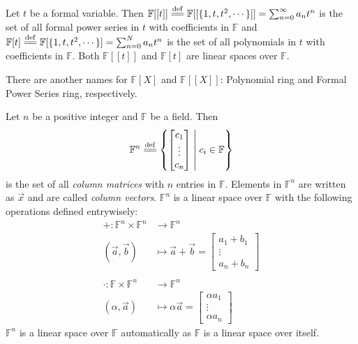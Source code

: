 \documentclass[
	11pt, %
	fleqn, %
	a4paper, %
]{LegrandOrangeBook}
\newcommand{\F}{\mathbb{F}} %
\begin{document}
\begin{example}
    Let $t$ be a formal variable. Then $\F[[t]] \overset{\mathrm{def}}{=\joinrel=} \F[[\{ 1, t, t^2, \cdots \}]] = \sum_{n = 0}^{\infty} a_n t^n$ is the set of all formal power series in $t$ with coefficients in $\F$ and $\F[t] \overset{\mathrm{def}}{=\joinrel=} \F[\{ 1, t, t^2, \cdots \}] = \sum_{n = 0}^{N} a_n t^n$ is the set of all polynomials in $t$ with coefficients in $\F$. Both $\F[[t]]$ and $\F[t]$ are linear spaces over $\F$.
\end{example}

There are another names for $\F[X]$ and $\F[[X]]$: Polynomial ring and Formal Power Series ring, respectively.

\begin{example}
    Let $n$ be a positive integer and $\F$ be a field. Then 
    \[
        \F^n \overset{\mathrm{def}}{=\joinrel=} \left\{ 
        \begin{bmatrix}
        c_1 \\
        \vdots \\
        c_n
        \end{bmatrix}
        \;\middle|\; c_i \in \F
        \right\}
    \]
    is the set of all \emph{column matrices} with $n$ entries in $\F$. Elements in $\F^n$ are written as $\vec{x}$ and are called \emph{column vectors}. $\F^n$ is a linear space over $\F$ with the following operations defined entrywisely:
    \[
        \begin{split}
            + : \F^n \times \F^n &\to \F^n \\
            (\vec{a}, \vec{b}) &\mapsto \vec{a} + \vec{b} = \begin{bmatrix}
            a_1 + b_1 \\
            \vdots \\
            a_n + b_n
            \end{bmatrix} \\ \\
            \cdot : \F \times \F^n &\to \F^n \\
            (\alpha, \vec{a}) &\mapsto \alpha \vec{a} = \begin{bmatrix}
            \alpha a_1 \\
            \vdots \\
            \alpha a_n
            \end{bmatrix}
        \end{split}
    \]
    $\F^n$ is a linear space over $\F$ automatically as $\F$ is a linear space over itself.
\end{example}
\end{document}
